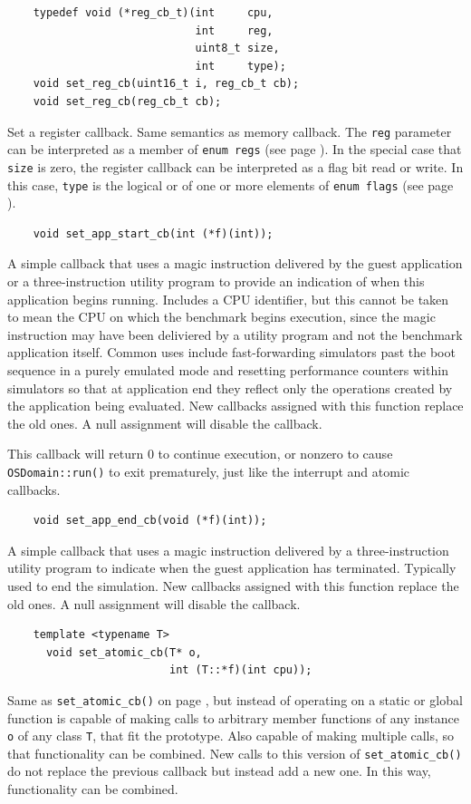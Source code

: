 \documentclass[letterpaper, 10pt]{book}
\begin{document}
\label{func:set_reg_cb} \begin{verbatim}
    typedef void (*reg_cb_t)(int     cpu,
                             int     reg,
                             uint8_t size,
                             int     type);
    void set_reg_cb(uint16_t i, reg_cb_t cb);
    void set_reg_cb(reg_cb_t cb);
\end{verbatim}
Set a register callback. Same semantics as memory callback. The \texttt{reg}
parameter can be interpreted as a member of \texttt{enum regs} (see page 
\pageref{enum:regs}). In the special case that \texttt{size} is zero, the
register callback can be interpreted as a flag bit read or write. In this case,
\texttt{type} is the logical or of one or more elements of \texttt{enum flags}
(see page \pageref{enum flags}).

\label{func:set_app_start_cb} \begin{verbatim}
    void set_app_start_cb(int (*f)(int));
\end{verbatim}
A simple callback that uses a magic instruction delivered by the guest 
application or a three-instruction utility program to provide an indication of
when this application begins running. Includes a CPU identifier, but
this cannot be taken to mean the CPU on which the benchmark begins execution,
since the magic instruction may have been deliviered by a utility program and
not the benchmark application itself. Common uses include fast-forwarding 
simulators past the boot sequence in a purely emulated mode and resetting
performance counters within simulators so that at application end they reflect
only the operations created by the application being evaluated. New callbacks
assigned with this function replace the old ones. A null assignment will
disable the callback.

This callback will return 0 to continue execution, or nonzero to cause
\texttt{OSDomain::run()} to exit prematurely, just like the interrupt and
atomic callbacks.

\label{func:set_app_end_cb} \begin{verbatim}
    void set_app_end_cb(void (*f)(int));
\end{verbatim}
A simple callback that uses a magic instruction delivered by a 
three-instruction utility program to indicate when the guest application has
terminated. Typically used to end the simulation. New callbacks
assigned with this function replace the old ones. A null assignment will
disable the callback.

\label{tf:set_atomic_cb} \begin{verbatim}
    template <typename T> 
      void set_atomic_cb(T* o, 
                         int (T::*f)(int cpu));
\end{verbatim}
Same as \texttt{set\_atomic\_cb()} on page \pageref{func:set_atomic_cb}, but
instead of operating on a static or global function is capable of making calls
to arbitrary member functions of any instance \texttt{o} of any class 
\texttt{T}, that fit the prototype. Also capable of making
multiple calls, so that functionality can be combined. New calls to this
version of \texttt{set\_atomic\_cb()} do not replace the previous callback but
instead add a new one. In this way, functionality can be combined.
\end{document}
